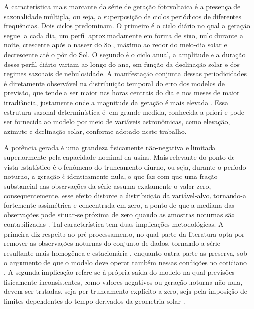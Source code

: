 A característica mais marcante da série de geração fotovoltaica é a presença de
sazonalidade múltipla, ou seja, a superposição de ciclos periódicos de diferentes
frequências. Dois ciclos predominam. O primeiro é o ciclo diário no qual a geração segue,
a cada dia, um perfil aproximadamente em forma de sino, nulo durante a noite, crescente
após o nascer do Sol, máximo ao redor do meio-dia solar e decrescente até o pôr do Sol. O
segundo é o ciclo anual, a amplitude e a duração desse perfil diário variam ao longo
do ano, em função da declinação solar e dos regimes sazonais de nebulosidade. A
manifestação conjunta dessas periodicidades é diretamente observável na distribuição
temporal do erro dos modelos de previsão, que tende a ser maior nas horas centrais do dia e
nos meses de maior irradiância, justamente onde a magnitude da geração é mais elevada
\cite{Kappler2024}. Essa estrutura sazonal determinística é, em grande medida, conhecida a
priori e pode ser fornecida ao modelo por meio de variáveis astronômicas, como elevação,
azimute e declinação solar, conforme adotado neste trabalho.

A potência gerada é uma grandeza fisicamente não-negativa e limitada superiormente
pela capacidade nominal da usina. Mais relevante do ponto de vista estatístico é o
fenômeno do truncamento diurno, ou seja, durante o período noturno, a geração é
identicamente nula, o que faz com que uma fração substancial das observações da série
assuma exatamente o valor zero, consequentemente, esse efeito distorce a distribuição da variável-alvo, tornando-a fortemente assimétrica e concentrada em zero, a ponto de que a mediana das
observações pode situar-se próxima de zero quando as amostras noturnas são contabilizadas
\cite{Andrade2023}. Tal característica tem duas implicações metodológicas. A primeira diz
respeito ao pré-processamento, no qual parte da literatura opta por remover as observações noturnas do conjunto de dados, tornando a série resultante mais homogênea e estacionária
\cite{Khalyasmaa2020}, enquanto outra parte as preserva, sob o argumento de que o modelo deve operar também nessas condições no cotidiano \cite{Andrade2023}. A segunda implicação refere-se à
própria saída do modelo na qual previsões fisicamente inconsistentes, como valores negativos ou
geração noturna não nula, devem ser tratadas, seja por truncamento explícito a zero, seja
pela imposição de limites dependentes do tempo derivados da geometria solar
\cite{Markovics2022}.

